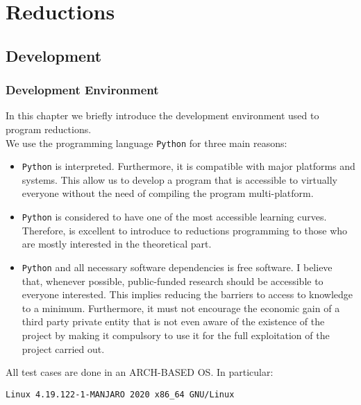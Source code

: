 \part{Reductions} %

\label{chap:3}


\chapter{Development}
\section{Development Environment}

In this chapter we briefly introduce the development environment used to program reductions.\\

We use the programming language \texttt{Python} for three main reasons:

\begin{itemize}
\item \texttt{Python} is interpreted. Furthermore, it is compatible with major platforms and systems. This allow us to develop a program that is accessible to virtually everyone without the need of compiling the program multi-platform. 

\item \texttt{Python} is considered to have one of the most accessible learning curves. Therefore, is excellent to introduce to reductions programming to those who are mostly interested in the theoretical part.

\item \texttt{Python}  and all necessary software dependencies is  free software\cite{stallman2002free}. I believe that, whenever possible, public-funded research should be accessible to everyone interested. This implies reducing the barriers to access to knowledge to a minimum.  Furthermore, it must not encourage the economic gain of a third party private entity that is not even aware of the existence of the project by making it compulsory to use it for the full exploitation of the project carried out.
\end{itemize}



All test cases are done in an ARCH-BASED OS. In particular:

  {\begin{center}
      \texttt{Linux 4.19.122-1-MANJARO  2020 x86\_64\ GNU/Linux}\\
    \end{center} }

